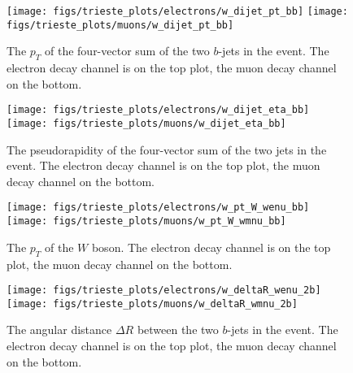 \clearpage


\begin{figure}[htb]
        \begin{center}
                \leavevmode
                \texttt{[image: figs/trieste\_plots/electrons/w\_dijet\_pt\_bb]}
                \texttt{[image: figs/trieste\_plots/muons/w\_dijet\_pt\_bb]}
        \end{center}
        \caption{The $p_{T}$ of the four-vector sum of the two $b$-jets in the event.
          The electron decay channel is on the top plot,
          the muon decay channel on the bottom.}
        \label{fig:dijetpt}
\end{figure}

\begin{figure}[htb]
        \begin{center}
                \leavevmode
                \texttt{[image: figs/trieste\_plots/electrons/w\_dijet\_eta\_bb]}
                \texttt{[image: figs/trieste\_plots/muons/w\_dijet\_eta\_bb]}
        \end{center}
        \caption{The pseudorapidity of the four-vector sum of the two jets in the event.
          The electron decay channel is on the top plot,
          the muon decay channel on the bottom.}
        \label{fig:dijeteta}
\end{figure}

\begin{figure}[htb]
        \begin{center}
                \leavevmode
                \texttt{[image: figs/trieste\_plots/electrons/w\_pt\_W\_wenu\_bb]}
                \texttt{[image: figs/trieste\_plots/muons/w\_pt\_W\_wmnu\_bb]}
        \end{center}
        \caption{The $p_{T}$ of the $W$ boson.
          The electron decay channel is on the top plot,
          the muon decay channel on the bottom.}
        \label{fig:Wpt}
\end{figure}

\begin{figure}[htb]
        \begin{center}
                \leavevmode
                \texttt{[image: figs/trieste\_plots/electrons/w\_deltaR\_wenu\_2b]}
                \texttt{[image: figs/trieste\_plots/muons/w\_deltaR\_wmnu\_2b]}
        \end{center}
        \caption{The angular distance $\Delta R$ between the two $b$-jets in the event.
          The electron decay channel is on the top plot,
          the muon decay channel on the bottom.}
        \label{fig:bjetDeltaR}
\end{figure}

